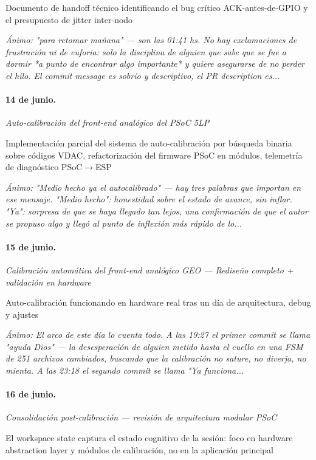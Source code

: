 Documento de handoff técnico identificando el bug crítico ACK-antes-de-GPIO y el presupuesto de jitter inter-nodo

{\footnotesize\itshape \'Animo: "para retomar mañana" --- son las 01:41 hs. No hay exclamaciones de frustración ni de euforia: solo la disciplina de alguien que sabe que se fue a dormir *a punto de encontrar algo importante* y quiere asegurarse de no perder el hilo. El commit message es sobrio y descriptivo, el PR description es...}

\paragraph{14 de junio.}
\emph{Auto-calibración del front-end analógico del PSoC 5LP}

Implementación parcial del sistema de auto-calibración por búsqueda binaria sobre códigos VDAC, refactorización del firmware PSoC en módulos, telemetría de diagnóstico PSoC$\rightarrow$ESP

{\footnotesize\itshape \'Animo: "Medio hecho ya el autocalibrado" --- hay tres palabras que importan en ese mensaje. "Medio hecho": honestidad sobre el estado de avance, sin inflar. "Ya": sorpresa de que se haya llegado tan lejos, una confirmación de que el autor se propuso algo y llegó al punto de inflexión más rápido de lo...}

\paragraph{15 de junio.}
\emph{Calibración automática del front-end analógico GEO --- Rediseño completo + validación en hardware}

Auto-calibración funcionando en hardware real tras un día de arquitectura, debug y ajustes

{\footnotesize\itshape \'Animo: El arco de este día lo cuenta todo. A las 19:27 el primer commit se llama "ayuda Dios" --- la desesperación de alguien metido hasta el cuello en una FSM de 251 archivos cambiados, buscando que la calibración no sature, no diverja, no mienta. A las 23:18 el segundo commit se llama "Ya funciona...}

\paragraph{16 de junio.}
\emph{Consolidación post-calibración --- revisión de arquitectura modular PSoC}

El workspace state captura el estado cognitivo de la sesión: foco en hardware abstraction layer y módulos de calibración, no en la aplicación principal

